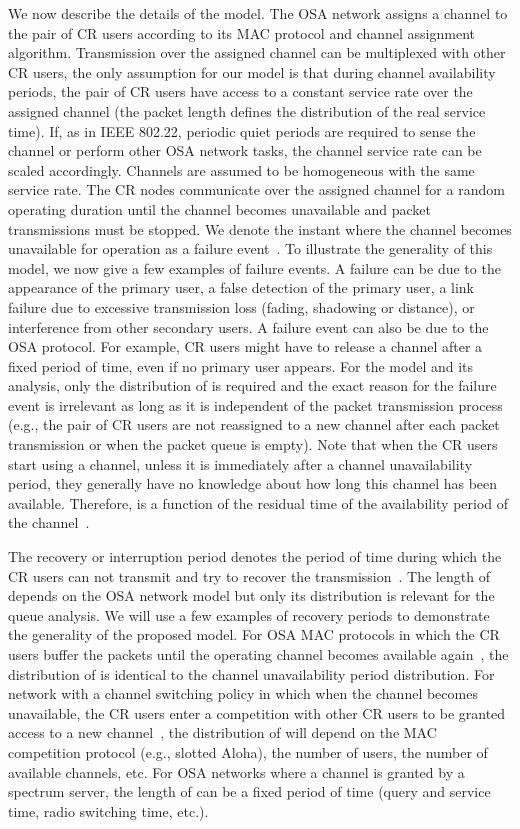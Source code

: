 \documentclass[11pt,journal,oneside,onecolumn,draftclsnofoot]{IEEEtran}
\begin{document}
We now describe the details of the model. The OSA network assigns a channel to the pair of CR users according to its MAC protocol and channel assignment algorithm. Transmission over the assigned channel can be multiplexed with other CR users, the only assumption for our model is that during channel availability periods, the pair of CR users have access to a constant service rate over the assigned channel (the packet length defines the distribution of the real service time). If, as in IEEE 802.22, periodic quiet periods are required to sense the channel or perform other OSA network tasks, the channel service rate can be scaled accordingly. Channels are assumed to be homogeneous with the same service rate.
The CR nodes communicate over the assigned channel for a random operating duration  until the channel becomes unavailable and packet transmissions must be stopped. We denote the instant where the channel becomes unavailable for operation as a failure event~\cite{azarfar11}. To illustrate the generality of this model, we now give a few examples of failure events. A failure can be due to the appearance of the primary user, a false detection of the primary user, a link failure due to excessive transmission loss (fading, shadowing or distance), or interference from other secondary users. A failure event can also be due to the OSA protocol. For example, CR users might have to release a channel after a fixed period of time, even if no primary user appears. 
For the model and its analysis, only the distribution of  is required and the exact reason for the failure event is irrelevant as long as it is independent of the packet transmission process (e.g., the pair of CR users are not reassigned to a new channel after each packet transmission or when the packet queue is empty).  Note that when the CR users start using a channel, unless it is immediately after a channel unavailability period, they generally have no knowledge about how long this channel has been available. Therefore,  is a function of the residual time of the availability period of the channel~\cite{azarfar12e}. 

The recovery or interruption period denotes the period of time  during which the CR users can not transmit and try to recover the transmission~\cite{azarfar11}. The length of  depends on the OSA network model but only its distribution is relevant for the queue analysis. We will use a few examples of recovery periods to demonstrate the generality of the proposed model. For OSA MAC protocols in which the CR users buffer the packets until the operating channel becomes available again~\cite{park11}, the distribution of  is identical to the channel unavailability period distribution. For network with a channel switching policy in which when the channel becomes unavailable, the CR users enter a competition with other CR users to be granted access to a new channel~\cite{park11}, the distribution of  will depend on the MAC competition protocol (e.g., slotted Aloha), the number of users, the number of available channels, etc. For OSA networks where a channel is granted by a spectrum server, the length of  can be a fixed period of time (query and service time, radio switching time, etc.).
\end{document}
